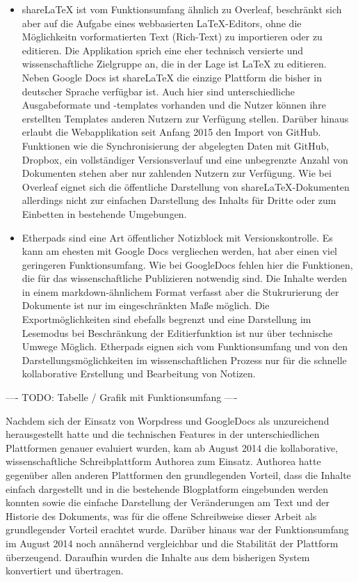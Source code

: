 \begin{itemize}
\item shareLaTeX ist vom Funktionsumfang ähnlich zu Overleaf, beschränkt sich aber auf die Aufgabe eines webbasierten LaTeX-Editors, ohne die Möglichkeitn vorformatierten Text (Rich-Text) zu importieren oder zu editieren. Die Applikation sprich eine eher technisch versierte und wissenschaftliche Zielgruppe an, die in der Lage ist LaTeX zu editieren. Neben Google Docs ist shareLaTeX die einzige Plattform die bisher in deutscher Sprache verfügbar ist. Auch hier sind unterschiedliche Ausgabeformate und -templates vorhanden und die Nutzer können ihre erstellten Templates anderen Nutzern zur Verfügung stellen. Darüber hinaus erlaubt die Webapplikation seit Anfang 2015 den Import von GitHub. Funktionen wie die Synchronisierung der abgelegten Daten mit GitHub, Dropbox, ein vollständiger Versionsverlauf und eine unbegrenzte Anzahl von Dokumenten stehen aber nur zahlenden Nutzern zur Verfügung. Wie bei Overleaf eignet sich die öffentliche Darstellung von shareLaTeX-Dokumenten allerdings nicht zur einfachen Darstellung des Inhalts für Dritte oder zum Einbetten in bestehende Umgebungen.
\item Etherpads sind eine Art öffentlicher Notizblock mit Versionskontrolle. Es kann am ehesten mit Google Docs vergliechen werden, hat aber einen viel geringeren Funktionsumfang. Wie bei GoogleDocs fehlen hier die Funktionen, die für das wissenschaftliche Publizieren notwendig sind. Die Inhalte werden in einem markdown-ähnlichem Format verfasst aber die Stukrurierung der Dokumente ist nur im eingeschränkten Maße möglich. Die Exportmöglichkeiten sind ebefalls begrenzt und eine Darstellung im Lesemodus bei Beschränkung der Editierfunktion ist nur über technische Umwege Möglich. Etherpads eignen sich vom Funktionsumfang und von den Darstellungsmöglichkeiten im wissenschaftlichen Prozess nur für die schnelle kollaborative Erstellung und Bearbeitung von Notizen.
\end{itemize}

---- TODO: Tabelle / Grafik mit Funktionsumfang ----

Nachdem sich der Einsatz von Worpdress und GoogleDocs als unzureichend herausgestellt hatte und die technischen Features in der unterschiedlichen Plattformen genauer evaluiert wurden, kam ab August 2014 die kollaborative, wissenschaftliche Schreibplattform Authorea zum Einsatz. Authorea hatte gegenüber allen anderen Plattformen den grundlegenden Vorteil, dass die Inhalte einfach dargestellt und in die bestehende Blogplatform eingebunden werden konnten sowie die einfache Darstellung der Veränderungen am Text und der Historie des Dokuments, was für die offene Schreibweise dieser Arbeit als grundlegender Vorteil erachtet wurde. Darüber hinaus war der Funktionsumfang im August 2014 noch annähernd vergleichbar und die Stabilität der Plattform überzeugend. Daraufhin wurden die Inhalte aus dem bisherigen System konvertiert und übertragen.


